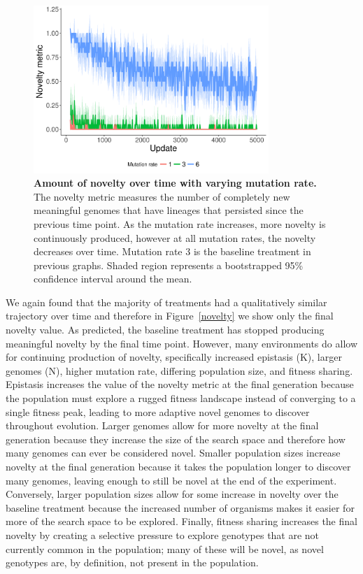 \documentclass[letterpaper]{article}
\begin{document}
\begin{figure}
\includegraphics[width=3.5in]{figs/novelty_mean_mut_rate.png}
\caption{\textbf{Amount of novelty over time with varying mutation rate.} The novelty metric measures the number of completely new meaningful genomes that have lineages that persisted since the previous time point. As the mutation rate increases, more novelty is continuously produced, however at all mutation rates, the novelty decreases over time. Mutation rate 3 is the baseline treatment in previous graphs. Shaded region represents a bootstrapped 95\% confidence interval around the mean.}
\label{novelty_time}
\end{figure}

We again found that the majority of treatments had a qualitatively similar trajectory over time and therefore in Figure~\ref{novelty} we show only the final novelty value. As predicted, the baseline treatment has stopped producing meaningful novelty by the final time point. However, many environments do allow for continuing production of novelty, specifically increased epistasis (K), larger genomes (N), higher mutation rate, differing population size, and fitness sharing. Epistasis increases the value of the novelty metric at the final generation because the population must explore a rugged fitness landscape instead of converging to a single fitness peak, leading to more adaptive novel genomes to discover throughout evolution. Larger genomes allow for more novelty at the final generation because they increase the size of the search space and therefore how many genomes can ever be considered novel. Smaller population sizes increase novelty at the final generation because it takes the population longer to discover many genomes, leaving enough to still be novel at the end of the experiment. Conversely, larger population sizes allow for some increase in novelty over the baseline treatment because the increased number of organisms makes it easier for more of the search space to be explored. Finally, fitness sharing increases the final novelty by creating a selective pressure to explore genotypes that are not currently common in the population; many of these will be novel, as novel genotypes are, by definition, not present in the population.
\end{document}
